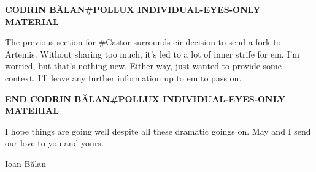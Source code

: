 \begin{center}
\textbf{CODRIN BĂLAN\#POLLUX INDIVIDUAL-EYES-ONLY MATERIAL}
\end{center}

The previous section for \#Castor surrounds eir decision to send a fork to Artemis. Without sharing too much, it's led to a lot of inner strife for em. I'm worried, but that's nothing new. Either way, just wanted to provide some context. I'll leave any further information up to em to pass on.

\begin{center}
\textbf{END CODRIN BĂLAN\#POLLUX INDIVIDUAL-EYES-ONLY MATERIAL}
\end{center}

I hope things are going well despite all these dramatic goings on. May and I send our love to you and yours.

Ioan Bălan
